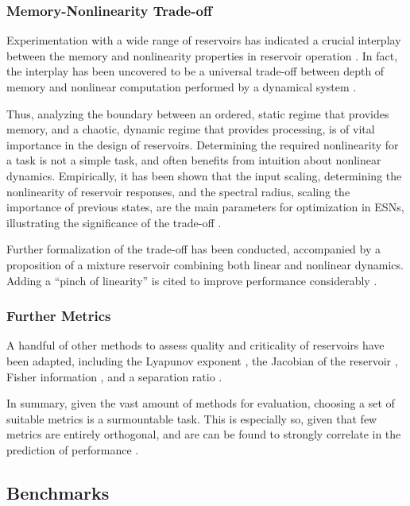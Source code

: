 \subsubsection{Memory-Nonlinearity Trade-off}

Experimentation with a wide range of reservoirs has indicated a crucial
interplay between the memory and nonlinearity properties in reservoir operation
\cite{verstraeten_memory_2010}. In fact, the interplay has been uncovered to be
a universal trade-off between depth of memory and nonlinear computation
performed by a dynamical system \cite{dambre_information_2012}.

Thus, analyzing the boundary between an ordered, static regime that provides
memory, and a chaotic, dynamic regime that provides processing, is of vital
importance in the design of reservoirs. Determining the required nonlinearity
for a task is not a simple task, and often benefits from intuition about
nonlinear dynamics. Empirically, it has been shown that the input scaling,
determining the nonlinearity of reservoir responses, and the spectral radius,
scaling the importance of previous states, are the main parameters for
optimization in ESNs, illustrating the significance of the trade-off
\cite{montavon_practical_2012}.

Further formalization of the trade-off has been conducted, accompanied by a
proposition of a mixture reservoir combining both linear and nonlinear
dynamics. Adding a ``pinch of linearity'' is cited to improve performance
considerably \cite{inubushi_reservoir_2017}.

\subsubsection{Further Metrics}

A handful of other methods to assess quality and criticality of reservoirs have
been adapted, including the Lyapunov exponent
\cite{verstraeten_experimental_2007}, the Jacobian of the reservoir
\cite{alippi_quantification_2009}, Fisher information
\cite{livi_determination_2018}, and a separation ratio
\cite{gibbons_unifying_2010}.

In summary, given the vast amount of methods for evaluation, choosing a set of
suitable metrics is a surmountable task. This is especially so, given that few
metrics are entirely orthogonal, and are can be found to strongly correlate in
the prediction of performance \cite{chrol-cannon_correlation_2014}.

\subsection{Benchmarks}


